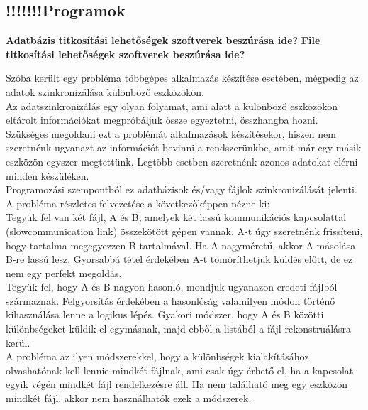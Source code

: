 \subsection{!!!!!!!Programok}
 \textbf{Adatbázis titkosítási lehetőségek szoftverek beszúrása ide?}
 \textbf{File titkosítási lehetőségek szoftverek beszúrása ide?}



\newpage {}

Szóba került egy probléma többgépes alkalmazás készítése esetében, mégpedig az adatok szinkronizálása különböző eszközökön.
\vspace{5pt} \\ Az adatszinkronizálás egy olyan folyamat, ami alatt a különböző eszközökön eltárolt információkat megpróbáljuk össze egyeztetni, összhangba hozni.
\vspace{5pt} \\Szükséges megoldani ezt a problémát alkalmazások készítésekor, hiszen nem szeretnénk ugyanazt az információt bevinni a rendszerünkbe, amit már egy másik eszközön egyszer megtettünk. Legtöbb esetben szeretnénk azonos adatokat elérni minden készüléken.
\vspace{5pt} \\Programozási szempontból ez adatbázisok és/vagy fájlok szinkronizálását jelenti.
\vspace{15pt} \\ A probléma részletes felvezetése a következőképpen nézne ki:
\vspace{5pt} \\ \indent Tegyük fel van két fájl, A és B, amelyek két lassú kommunikációs kapcsolattal (slowcommunication link) összekötött gépen vannak. A-t úgy szeretnénk frissíteni, hogy tartalma megegyezzen B tartalmával.  Ha A nagyméretű, akkor A másolása B-re lassú lesz. Gyorsabbá tétel érdekében A-t tömöríthetjük küldés előtt, de ez nem egy perfekt megoldás.
\vspace{5pt} \\ Tegyük fel, hogy A és B nagyon hasonló, mondjuk ugyanazon eredeti fájlból származnak. Felgyorsítás érdekében a hasonlóság valamilyen módon történő kihasználása lenne a logikus lépés. Gyakori módszer, hogy A és B közötti különbségeket küldik el egymásnak, majd ebből a listából a fájl rekonstruálásra kerül. 
\vspace{5pt} \\ A probléma az ilyen módszerekkel, hogy a különbségek kialakításához olvashatónak kell lennie mindkét fájlnak, ami csak úgy érhető el, ha a kapcsolat egyik végén mindkét fájl rendelkezésre áll. Ha nem található meg egy eszközön mindkét fájl, akkor nem használhatók ezek a módszerek.
